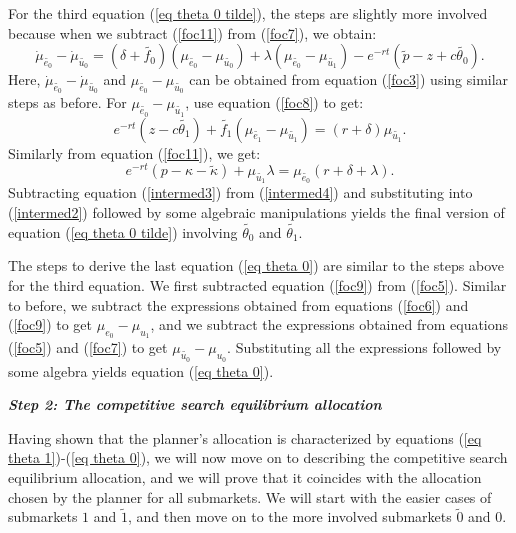 \documentclass[12pt]{article} %
\theoremstyle{definition}
\begin{document}
\begin{appendix}
For the third equation (\ref{eq theta 0 tilde}), the steps are slightly more involved because when we subtract (\ref{foc11}) from (\ref{foc7}), we obtain:
\begin{equation}
   \dot{\mu}_{\tilde{e_0}}-\dot{\mu}_{\tilde{u_0}}=(\delta + \tilde{f_0})(\mu_{\tilde{e_0}}-\mu_{\tilde{u_0}}) + \lambda(\mu_{\tilde{e_0}}-\mu_{\tilde{u_1}})-e^{-rt}(\tilde{p}-z+c\tilde{\theta_0}). \label{intermed2}
\end{equation}
Here, $\dot{\mu}_{\tilde{e_0}}-\dot{\mu}_{\tilde{u_0}}$ and $\mu_{\tilde{e_0}}-\mu_{\tilde{u_0}}$ can be obtained from equation (\ref{foc3}) using similar steps as before. For $\mu_{\tilde{e_0}}-\mu_{\tilde{u_1}}$, use equation (\ref{foc8}) to get:
\begin{equation}
    e^{-rt}(z-c\tilde{\theta_1}) + \tilde{f_1}(\mu_{\tilde{e_1}}-\mu_{\tilde{u_1}}) = (r+\delta){\mu}_{\tilde{u_1}}. \label{intermed3}
\end{equation}
Similarly from equation (\ref{foc11}), we get:  
\begin{equation}
    e^{-rt}(p-\kappa-\tilde{\kappa})+\mu_{\tilde{u_1}} \lambda = \mu_{\tilde{e_0}}(r + \delta + \lambda). \label{intermed4}
\end{equation}
Subtracting equation (\ref{intermed3}) from (\ref{intermed4}) and substituting into (\ref{intermed2}) followed by some algebraic manipulations yields the final version of equation (\ref{eq theta 0 tilde}) involving $\tilde{\theta_0}$ and $\tilde{\theta_1}$. 

The steps to derive the last equation (\ref{eq theta 0}) are similar to the steps above for the third equation. We first subtracted equation (\ref{foc9}) from (\ref{foc5}). Similar to before, we subtract the expressions obtained from equations (\ref{foc6}) and (\ref{foc9}) to get $\mu_{e_0}-\mu_{u_1}$, and we subtract the expressions obtained from equations (\ref{foc5}) and (\ref{foc7}) to get $\mu_{\tilde{u_0}}-\mu_{u_0}$. Substituting all the expressions followed by some algebra yields equation (\ref{eq theta 0}).

\medskip 

\noindent \textit{\textbf{Step 2: The competitive search equilibrium allocation}} 

\medskip 


\noindent Having shown that the planner's allocation is characterized by equations (\ref{eq theta 1})-(\ref{eq theta 0}), we will now move on to describing the competitive search equilibrium allocation, and we will prove that it coincides with the allocation chosen by the planner for all submarkets. We will start with the easier cases of submarkets $1$ and $\tilde{1}$, and then move on to the more involved submarkets $\tilde{0}$ and $0$. 


\end{appendix}
\end{document}
